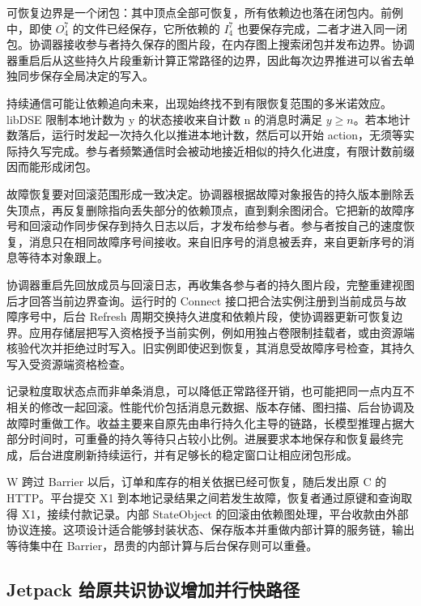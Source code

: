 
可恢复边界是一个闭包：其中顶点全部可恢复，所有依赖边也落在闭包内。前例中，即使 $O^7_4$ 的文件已经保存，它所依赖的 $I^7_4$ 也要保存完成，二者才进入同一闭包。协调器接收参与者持久保存的图片段，在内存图上搜索闭包并发布边界。协调器重启后从这些持久片段重新计算正常路径的边界，因此每次边界推进可以省去单独同步保存全局决定的写入。

持续通信可能让依赖追向未来，出现始终找不到有限恢复范围的多米诺效应。libDSE 限制本地计数为 y 的状态接收来自计数 n 的消息时满足 $y\ge n$。若本地计数落后，运行时发起一次持久化以推进本地计数，然后可以开始 action，无须等实际持久写完成。参与者频繁通信时会被动地接近相似的持久化进度，有限计数前缀因而能形成闭包。

故障恢复要对回滚范围形成一致决定。协调器根据故障对象报告的持久版本删除丢失顶点，再反复删除指向丢失部分的依赖顶点，直到剩余图闭合。它把新的故障序号和回滚动作同步保存到持久日志以后，才发布给参与者。参与者按自己的速度恢复，消息只在相同故障序号间接收。来自旧序号的消息被丢弃，来自更新序号的消息等待本对象跟上。

协调器重启先回放成员与回滚日志，再收集各参与者的持久图片段，完整重建视图后才回答当前边界查询。运行时的 Connect 接口把合法实例注册到当前成员与故障序号中，后台 Refresh 周期交换持久进度和依赖片段，使协调器更新可恢复边界。应用存储层把写入资格授予当前实例，例如用独占卷限制挂载者，或由资源端核验代次并拒绝过时写入。旧实例即使迟到恢复，其消息受故障序号检查，其持久写入受资源端资格检查。

记录粒度取状态点而非单条消息，可以降低正常路径开销，也可能把同一点内互不相关的修改一起回滚。性能代价包括消息元数据、版本存储、图扫描、后台协调及故障时重做工作。收益主要来自原先由串行持久化主导的链路，长模型推理占据大部分时间时，可重叠的持久等待只占较小比例。进展要求本地保存和恢复最终完成，后台进度刷新持续运行，并有足够长的稳定窗口让相应闭包形成。

W 跨过 Barrier 以后，订单和库存的相关依据已经可恢复，随后发出原 C 的 HTTP。平台提交 X1 到本地记录结果之间若发生故障，恢复者通过原键和查询取得 X1，接续付款记录。内部 StateObject 的回滚由依赖图处理，平台收款由外部协议连接。这项设计适合能够封装状态、保存版本并重做内部计算的服务链，输出等待集中在 Barrier，昂贵的内部计算与后台保存则可以重叠。

\subsection{Jetpack 给原共识协议增加并行快路径}

